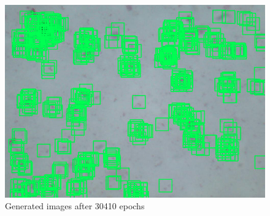 \begin{figure}[h]
\label{fig:gen250}
\begin{center}
\includegraphics[scale=0.45]{./images/object_detected.png}

\end{center}
\caption{Generated images after 30410 epochs}
\end{figure}



